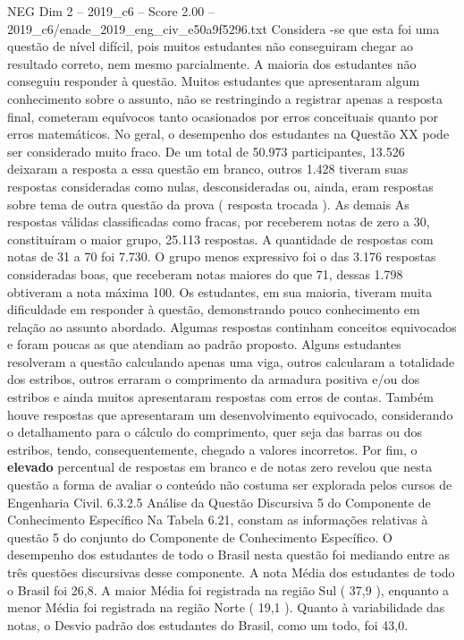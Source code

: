 \begin{textsample}{NEG Dim 2 – 2019\_c6 – Score 2.00 – 2019\_c6/enade\_2019\_eng\_civ\_e50a9f5296.txt}
Considera -se que esta foi uma questão de nível difícil, pois muitos estudantes não conseguiram chegar ao resultado correto, nem mesmo parcialmente.
A maioria dos estudantes não conseguiu responder à questão.
Muitos estudantes que apresentaram algum conhecimento sobre o assunto, não se restringindo a registrar apenas a resposta final, cometeram equívocos tanto ocasionados por erros conceituais quanto por erros matemáticos.
No geral, o desempenho dos estudantes na Questão XX pode ser considerado muito fraco.
De um total de 50.973 participantes, 13.526 deixaram a resposta a essa questão em branco, outros 1.428 tiveram suas respostas consideradas como nulas, desconsideradas ou, ainda, eram respostas sobre tema de outra questão da prova ( resposta trocada ).
As demais As respostas válidas classificadas como fracas, por receberem notas de zero a 30, constituíram o maior grupo, 25.113 respostas.
A quantidade de respostas com notas de 31 a 70 foi 7.730.
O grupo menos expressivo foi o das 3.176 respostas consideradas boas, que receberam notas maiores do que 71, dessas 1.798 obtiveram a nota máxima 100.
Os estudantes, em sua maioria, tiveram muita dificuldade em responder à questão, demonstrando pouco conhecimento em relação ao assunto abordado.
Algumas respostas continham conceitos equivocados e foram poucas as que atendiam ao padrão proposto.
Alguns estudantes resolveram a questão calculando apenas uma viga, outros calcularam a totalidade dos estribos, outros erraram o comprimento da armadura positiva e/ou dos estribos e ainda muitos apresentaram respostas com erros de contas.
Também houve respostas que apresentaram um desenvolvimento equivocado, considerando o detalhamento para o cálculo do comprimento, quer seja das barras ou dos estribos, tendo, consequentemente, chegado a valores incorretos.
Por fim, o \textbf{elevado} percentual de respostas em branco e de notas zero revelou que nesta questão a forma de avaliar o conteúdo não costuma ser explorada pelos cursos de Engenharia Civil. 6.3.2.5 Análise da Questão Discursiva 5 do Componente de Conhecimento Específico Na Tabela 6.21, constam as informações relativas à questão 5 do conjunto do Componente de Conhecimento Específico.
O desempenho dos estudantes de todo o Brasil nesta questão foi mediando entre as três questões discursivas desse componente.
A nota Média dos estudantes de todo o Brasil foi 26,8.
A maior Média foi registrada na região Sul ( 37,9 ), enquanto a menor Média foi registrada na região Norte ( 19,1 ).
Quanto à variabilidade das notas, o Desvio padrão dos estudantes do Brasil, como um todo, foi 43,0.

\end{textsample}
